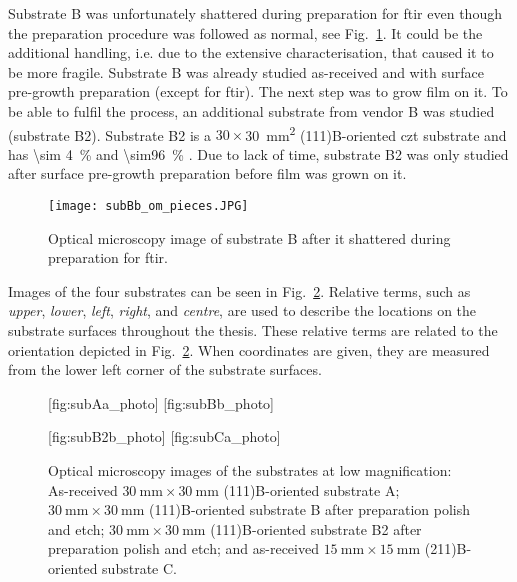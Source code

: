 Substrate B was unfortunately shattered during preparation for \ac{ftir} even though the preparation procedure was followed as normal, see Fig.~\ref{fig:subB_om_6x_pieces}. It could be the additional handling, i.e. due to the extensive characterisation, that caused it to be more fragile. Substrate B was already studied as-received and with surface pre-growth preparation (except for \ac{ftir}). The next step was to grow  film on it. To be able to fulfil the process, an additional substrate from vendor B was studied (substrate B2). Substrate B2 is a $30\times$\SI{30}{\milli\metre^2} (111)B-oriented \ac{czt} substrate and has \SI{\sim 4}{\percent}  and \SI{\sim96}{\percent} . Due to lack of time, substrate B2 was only studied after surface pre-growth preparation before  film was grown on it.

\begin{figure}[htbp]
    \centering
    \texttt{[image: subBb\_om\_pieces.JPG]}
    \caption[Optical microscopy image of substrate B after it shattered.]{Optical microscopy image of substrate B after it shattered during preparation for \ac{ftir}.}
    \label{fig:subB_om_6x_pieces}
\end{figure}

Images of the four substrates can be seen in Fig.~\ref{fig:substrateABC}. Relative terms, such as \emph{upper}, \emph{lower}, \emph{left}, \emph{right}, and \emph{centre}, are used to describe the locations on the substrate surfaces throughout the thesis. These relative terms are related to the orientation depicted in Fig.~\ref{fig:substrateABC}. When coordinates are given, they are measured from the lower left corner of the substrate surfaces. %

\begin{figure}[htbp]
    \centering
    [fig:subAa_photo]
    \hfill
    [fig:subBb_photo]
    \par\bigskip
    [fig:subB2b_photo]
    \hfill
    [fig:subCa_photo]
    \caption[Optical microscopy images of the substrates at low magnification.]{Optical microscopy images of the substrates at low magnification:  As-received $\SI{30}{\milli\metre}\times\SI{30}{\milli\metre}$ (111)B-oriented substrate A;  $\SI{30}{\milli\metre}\times\SI{30}{\milli\metre}$ (111)B-oriented substrate B after preparation polish and etch;  $\SI{30}{\milli\metre}\times\SI{30}{\milli\metre}$ (111)B-oriented substrate B2 after preparation polish and etch; and  as-received $\SI{15}{\milli\metre}\times\SI{15}{\milli\metre}$ (211)B-oriented substrate C.}
    \label{fig:substrateABC}
\end{figure}

